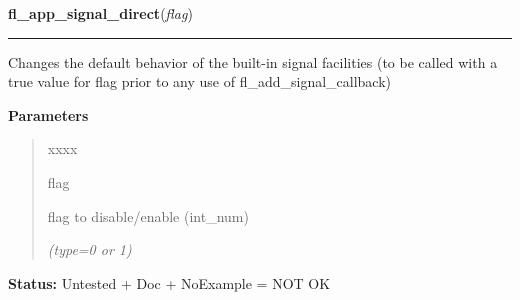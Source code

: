 \hspace{.8\funcindent}\begin{boxedminipage}{\funcwidth}

    \raggedright \textbf{fl\_app\_signal\_direct}(\textit{flag})

    \vspace{-1.5ex}

    \rule{\textwidth}{0.5\fboxrule}
\setlength{\parskip}{2ex}
    Changes the default behavior of the built-in signal facilities (to be 
    called with a true value for flag prior to any use of 
    fl\_add\_signal\_callback)

\setlength{\parskip}{1ex}
      \textbf{Parameters}
      \vspace{-1ex}

      \begin{quote}
        \begin{Ventry}{xxxx}

          \item[flag]

          flag to disable/enable (int\_num)

            {\it (type=0 or 1)}

        \end{Ventry}

      \end{quote}

\textbf{Status:} Untested + Doc + NoExample = NOT OK



    \end{boxedminipage}

    \label{xformslib:library:fl_add_timeout}

    \vspace{0.5ex}

